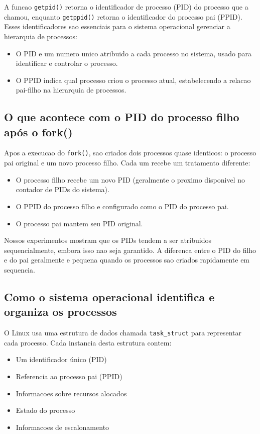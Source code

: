\documentclass[12pt]{article}
\begin{document}
A funcao \texttt{getpid()} retorna o identificador de processo (PID) do processo que a chamou, enquanto \texttt{getppid()} retorna o identificador do processo pai (PPID). Esses identificadores sao essenciais para o sistema operacional gerenciar a hierarquia de processos:

\begin{itemize}
    \item O PID e um numero unico atribuido a cada processo no sistema, usado para identificar e controlar o processo.
    \item O PPID indica qual processo criou o processo atual, estabelecendo a relacao pai-filho na hierarquia de processos.
\end{itemize}

\subsection{O que acontece com o PID do processo filho após o fork()}

Apos a execucao do \texttt{fork()}, sao criados dois processos quase identicos: o processo pai original e um novo processo filho. Cada um recebe um tratamento diferente:

\begin{itemize}
    \item O processo filho recebe um novo PID (geralmente o proximo disponivel no contador de PIDs do sistema).
    \item O PPID do processo filho e configurado como o PID do processo pai.
    \item O processo pai mantem seu PID original.
\end{itemize}

Nossos experimentos mostram que os PIDs tendem a ser atribuidos sequencialmente, embora isso nao seja garantido. A diferenca entre o PID do filho e do pai geralmente e pequena quando os processos sao criados rapidamente em sequencia.

\subsection{Como o sistema operacional identifica e organiza os processos}

O Linux usa uma estrutura de dados chamada \texttt{task\_struct} para representar cada processo. Cada instancia desta estrutura contem:

\begin{itemize}
    \item Um identificador único (PID)
    \item Referencia ao processo pai (PPID)
    \item Informacoes sobre recursos alocados
    \item Estado do processo
    \item Informacoes de escalonamento
\end{itemize}
\end{document}

